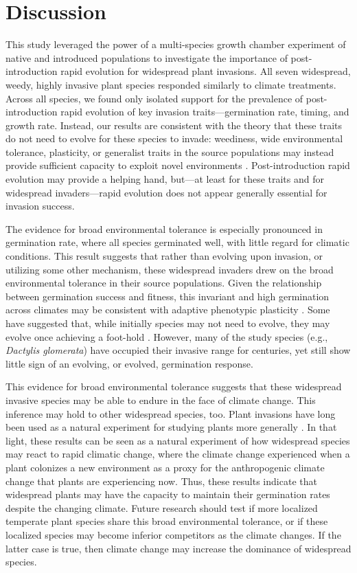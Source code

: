 \documentclass[12pt]{article}\usepackage[]{graphicx}\usepackage[]{color}
\begin{document}
	\section{Discussion}
	
	This study leveraged the power of a multi-species growth chamber experiment of native and introduced populations to investigate the importance of post-introduction rapid evolution for widespread plant invasions.  All seven widespread, weedy, highly invasive plant species responded similarly to climate treatments. Across all species, we found only isolated support for the prevalence of post-introduction rapid evolution of key invasion traits---germination rate, timing, and growth rate. Instead, our results are consistent with the theory that these traits do not need to evolve for these species to invade: weediness, wide environmental tolerance, plasticity, or generalist traits in the source populations may instead provide sufficient capacity to exploit novel environments \parencite{Baker1965}. Post-introduction rapid evolution may provide a helping hand, but---at least for these traits and for widespread invaders---rapid evolution does not appear generally essential for invasion success. 
	
	The evidence for broad environmental tolerance is especially pronounced in germination rate, where all species germinated well, with little regard for climatic conditions. This result suggests that rather than evolving upon invasion, or utilizing some other mechanism, these widespread invaders drew on the broad environmental tolerance in their source populations. Given the relationship between germination success and fitness, this invariant and high germination across climates may be consistent with adaptive phenotypic plasticity \parencite{Baker1965}. Some have suggested that, while initially species may not need to evolve, they may evolve once achieving a foot-hold \parencite{Lamarque2015}. However, many of the study species (e.g., \textit{Dactylis glomerata}) have occupied their invasive range for centuries, yet still show little sign of an evolving, or evolved, germination response. 
	
	This evidence for broad environmental tolerance suggests that these widespread invasive species may be able to endure in the face of climate change. This inference may hold to other widespread species, too.  Plant invasions have long been used as a natural experiment for studying plants more generally \parencite[e.g., ][]{Yoshida2007}. In that light, these results can be seen as a natural experiment of how widespread species may react to rapid climatic change, where the climate change experienced when a plant colonizes a new environment as a proxy for the anthropogenic climate change that plants are experiencing now. Thus, these results indicate that widespread plants may have the capacity to maintain their germination rates despite the changing climate. Future research should test if more localized temperate plant species share this broad environmental tolerance, or if these localized species may become inferior competitors as the climate changes. If the latter case is true, then climate change may increase the dominance of widespread species. 
\end{document}
